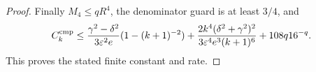 \begin{proof}
Finally $M_4\le qR^4$, the denominator guard is at least $3/4$, and
\begin{equation}\label{eq:sr-prcrate}
 C_k^{\rm cmp}\le
 \frac{\gamma^2-\delta^2}{3\varepsilon^2e}
       (1-(k+1)^{-2})
 +\frac{2k^4(\delta^2+\gamma^2)^2}{3\varepsilon^4e^3(k+1)^6}
 +108q16^{-q}.
\end{equation}
This proves the stated finite constant and rate.
\end{proof}


